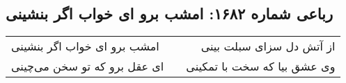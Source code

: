 \begin{center}
\section*{رباعی شماره ۱۶۸۲: امشب برو ای خواب اگر بنشینی}
\label{sec:1682}
\begin{longtable}{l p{0.5cm} r}
امشب برو ای خواب اگر بنشینی
&&
از آتش دل سزای سبلت بینی
\\
ای عقل برو که تو سخن می‌چینی
&&
وی عشق بیا که سخت با تمکینی
\\
\end{longtable}
\end{center}
